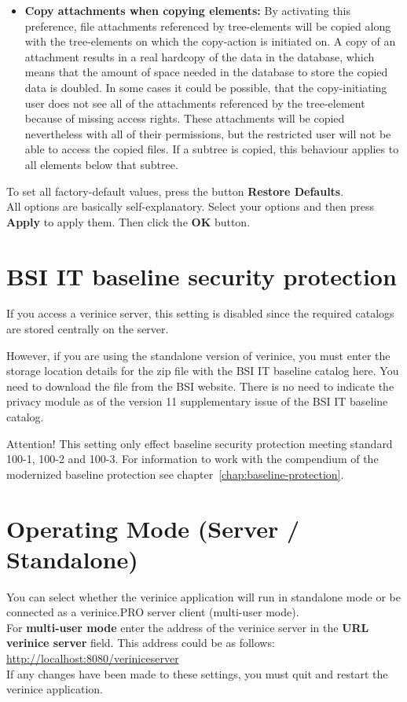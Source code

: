 \documentclass[a4paper,10pt]{book}
\begin{document}
\begin{itemize}
\item \textbf{Copy attachments when copying elements:}
By activating this preference, file attachments referenced by tree-elements
will be copied along with the tree-elements on which the copy-action is initiated on.
A copy of an attachment results in a real hardcopy of the data in the database,
which means that the amount of space needed in the database to store the
copied data is doubled.
In some cases it could be possible, that the copy-initiating user does not see all of the attachments
referenced by the tree-element because of missing access rights. These attachments will be copied nevertheless
with all of their permissions, but the restricted user will not be able to access the copied files.
If a subtree is copied, this behaviour applies to all elements below that subtree.
\end{itemize}
To set all factory-default values, press the button \textbf{Restore Defaults}.
\newline\\
All options are basically self-explanatory. Select your options and then press \textbf{Apply} to apply them. Then click the \textbf{OK} button.

\section{BSI IT baseline security protection}
If you access a verinice server, this setting is disabled since the required catalogs are stored centrally on the server.

However, if you are using the standalone version of verinice, you must enter the storage location details for the
zip file with the BSI IT baseline catalog here. You need to download the file from the BSI website. There is no need
to indicate the privacy module as of the version 11 supplementary issue of the BSI IT baseline catalog.

Attention! This setting only effect baseline security protection
meeting standard 100-1, 100-2 and 100-3.
For information to work with the compendium of the modernized baseline
protection see chapter~\ref{chap:baseline-protection}.

\section{Operating Mode (Server / Standalone)}
You can select whether the verinice application will run in standalone mode or be connected as a
verinice.\textsc{PRO} server client (multi-user mode).
\newline\\
For \textbf{multi-user mode} enter the address of the verinice server in the \textbf{URL verinice server} field.
This address could be as follows: \newline
\href{http://localhost:8080/veriniceserver}{http://localhost:8080/veriniceserver}
\newline\\
If any changes have been made to these settings, you must quit and restart the verinice application.
\end{document}

